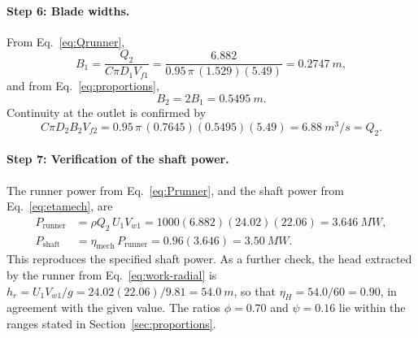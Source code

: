\documentclass[11pt,a4paper]{article}
\numberwithin{equation}{section}
\begin{document}
\paragraph{Step 6: Blade widths.} From Eq.~\eqref{eq:Qrunner},
\begin{equation}
  B_1 = \frac{Q_2}{C\pi D_1 V_{f1}} = \frac{6.882}{0.95\,\pi\,(1.529)(5.49)} = \SI{0.2747}{m},
  \label{eq:ex-B1}
\end{equation}
and from Eq.~\eqref{eq:proportions},
\begin{equation}
  B_2 = 2B_1 = \SI{0.5495}{m}.
  \label{eq:ex-B2}
\end{equation}
Continuity at the outlet is confirmed by
\begin{equation}
  C\pi D_2 B_2 V_{f2} = 0.95\,\pi\,(0.7645)(0.5495)(5.49) = \SI{6.88}{m^3/s} = Q_2.
  \label{eq:ex-cont}
\end{equation}

\paragraph{Step 7: Verification of the shaft power.} The runner power from Eq.~\eqref{eq:Prunner}, and the shaft power from Eq.~\eqref{eq:etamech}, are
\begin{align}
  P_{\mathrm{runner}} &= \rho Q_2\,U_1 V_{w1} = 1000(6.882)(24.02)(22.06) = \SI{3.646}{MW}, \label{eq:ex-Pr}\\
  P_{\mathrm{shaft}} &= \eta_{\mathrm{mech}}\,P_{\mathrm{runner}} = 0.96(3.646) = \SI{3.50}{MW}. \label{eq:ex-Ps}
\end{align}
This reproduces the specified shaft power. As a further check, the head extracted by the runner from Eq.~\eqref{eq:work-radial} is $h_r = U_1 V_{w1}/g = 24.02(22.06)/9.81 = \SI{54.0}{m}$, so that $\eta_H = 54.0/60 = 0.90$, in agreement with the given value. The ratios $\phi = 0.70$ and $\psi = 0.16$ lie within the ranges stated in Section~\ref{sec:proportions}.
\end{document}
